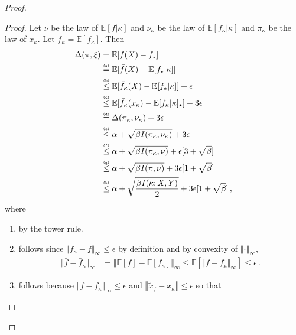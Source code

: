 \documentclass[letter, 12pt]{report}
\newcommand{\explan}[1]{\stackrel{\text{\tiny \texttt{#1}}}}
\newcommand{\norm}[1]{\left \Vert  #1 \right \Vert}
\newcommand{\snorm}[1]{ \Vert  #1 \Vert}
\newcommand{\E}{\mathbb E}
\newcommand{\1}{\mathbf{1}}
\theoremstyle{plain}
\theoremstyle{definition}
\theoremstyle{remark}
\begin{document}
\begin{proof}
    \begin{proof}
        Let $\nu$ be the law of $\E[f|\kappa]$ and $\nu_\kappa$ be the law of $\E[f_\kappa|\kappa]$ and
        $\pi_\kappa$ be the law of $x_\kappa$.
        Let $\bar f_\kappa = \E[f_\kappa]$.
        Then
        \begin{align*}
            \Delta(\pi, \xi)
             & = \E[\bar f(X) - f_\star]                                                                           \\
             & \explan{(a)}= \E[\bar f(X) - \E[f_\star|\kappa]]                                                    \\
             & \explan{(b)}\leq \E[\bar f_\kappa(X) - \E[f_\star|\kappa]] + \epsilon                               \\
             & \explan{(c)}\leq \E[\bar f_\kappa(x_\kappa) - \E[f_\kappa|\kappa]_\star] + 3 \epsilon               \\
             & \explan{(d)}= \Delta(\pi_\kappa, \nu_\kappa) + 3 \epsilon                                           \\
             & \explan{(e)}\leq \alpha + \sqrt{\beta I(\pi_\kappa, \nu_\kappa)} + 3 \epsilon                       \\
             & \explan{(f)}\leq \alpha + \sqrt{\beta I(\pi_\kappa, \nu)} + \epsilon[3 + \sqrt{\beta}]              \\
             & \explan{(g)}\leq \alpha + \sqrt{\beta I(\pi, \nu)} + 3\epsilon[1 + \sqrt{\beta}]                    \\
             & \explan{(h)}\leq \alpha + \sqrt{\frac{\beta I(\kappa ; X, Y)}{2}} + 3\epsilon[1 + \sqrt{\beta}] \,,
        \end{align*}
        where
        \begin{enumerate}
            \item by the tower rule.
            \item follows since $\snorm{f_\kappa - f}_\infty \leq \epsilon$ by definition and by convexity of $\norm{\cdot}_\infty$,
                  \begin{align*}
                      \snorm{\bar f - \bar f_\kappa}_\infty
                       & = \snorm{\E[f] - \E[f_\kappa]}_\infty
                      \leq \E[\snorm{f - f_\kappa}_\infty]
                      \leq \epsilon \,.
                  \end{align*}
            \item
                  follows because $\norm{f - f_\kappa}_\infty \leq \epsilon$ and $\norm{\tilde x_f - x_\kappa} \leq \epsilon$ so that

\end{enumerate}
\end{proof}
\end{proof}
\end{document}
